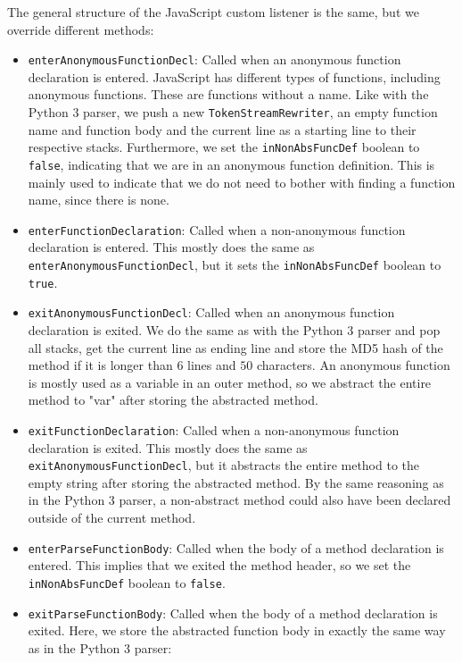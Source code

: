 \documentclass[../Main.tex]{subfiles}
\begin{document}
The general structure of the JavaScript custom listener is the same, but we override different methods:
\begin{itemize}
    \item \texttt{enterAnonymousFunctionDecl}: Called when an anonymous function declaration is entered. JavaScript has different types of functions, including anonymous functions. These are functions without a name. Like with the Python 3 parser, we push a new \texttt{TokenStreamRewriter}, an empty function name and function body and the current line as a starting line to their respective stacks. Furthermore, we set the \texttt{inNonAbsFuncDef} boolean to \texttt{false}, indicating that we are in an anonymous function definition. This is mainly used to indicate that we do not need to bother with finding a function name, since there is none.
    \item \texttt{enterFunctionDeclaration}: Called when a non-anonymous function declaration is entered. This mostly does the same as \texttt{enterAnonymousFunctionDecl}, but it sets the \texttt{inNonAbsFuncDef} boolean to \texttt{true}.
    \item \texttt{exitAnonymousFunctionDecl}: Called when an anonymous function declaration is exited. We do the same as with the Python 3 parser and pop all stacks, get the current line as ending line and store the MD5 hash of the method if it is longer than $6$ lines and $50$ characters. An anonymous function is mostly used as a variable in an outer method, so we abstract the entire method to "var" after storing the abstracted method.\\
    \item \texttt{exitFunctionDeclaration}: Called when a non-anonymous function declaration is exited. This mostly does the same as \texttt{exitAnonymousFunctionDecl}, but it abstracts the entire method to the empty string after storing the abstracted method. By the same reasoning as in the Python 3 parser, a non-abstract method could also have been declared outside of the current method.
    \item \texttt{enterParseFunctionBody}: Called when the body of a method declaration is entered. This implies that we exited the method header, so we set the \texttt{inNonAbsFuncDef} boolean to \texttt{false}.
    \item \texttt{exitParseFunctionBody}: Called when the body of a method declaration is exited. Here, we store the abstracted function body in exactly the same way as in the Python 3 parser:
    \begin{lstlisting}

\end{lstlisting}
\end{itemize}
\end{document}
